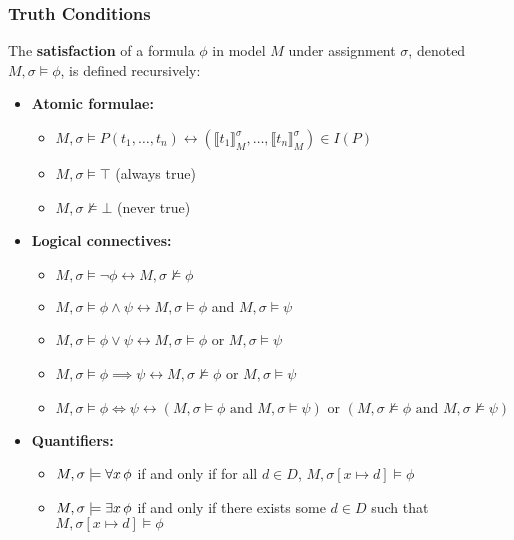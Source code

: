 \subsubsection{Truth Conditions}
The \textbf{satisfaction} of a formula \(\phi\) in model \(M\) under assignment \(\sigma\), denoted \(M, \sigma \models \phi\), is defined recursively:

\begin{itemize}
  \item \textbf{Atomic formulae:}
  \begin{itemize}
    \item \(M, \sigma \models P(t_1, \ldots, t_n) \leftrightarrow (\llbracket t_1 \rrbracket_M^\sigma, \ldots, \llbracket t_n \rrbracket_M^\sigma) \in I(P)\)
    \item \(M, \sigma \models \top\) (always true)
    \item \(M, \sigma \not\models \bot\) (never true)
  \end{itemize}
  
  \item \textbf{Logical connectives:}
  \begin{itemize}
    \item \(M, \sigma \models \neg \phi \leftrightarrow M, \sigma \not\models \phi\)
    \item \(M, \sigma \models \phi \land \psi \leftrightarrow M, \sigma \models \phi\) and \(M, \sigma \models \psi\)
    \item \(M, \sigma \models \phi \lor \psi \leftrightarrow M, \sigma \models \phi\) or \(M, \sigma \models \psi\)
    \item \(M, \sigma \models \phi \implies \psi \leftrightarrow M, \sigma \not\models \phi\) or \(M, \sigma \models \psi\)
    \item \(M, \sigma \models \phi \iff \psi \leftrightarrow \left(M, \sigma \models \phi \text{ and } M, \sigma \models \psi\right) \text{ or } \left(M, \sigma \not\models \phi \text{ and } M, \sigma \not\models \psi\right)\)
  \end{itemize}
  
  \item \textbf{Quantifiers:}
  \begin{itemize}
    \item \(M, \sigma \models \forall x \, \phi\) if and only if for all \(d \in D\), \(M, \sigma[x \mapsto d] \models \phi\)
    \item \(M, \sigma \models \exists x \, \phi\) if and only if there exists some \(d \in D\) such that \(M, \sigma[x \mapsto d] \models \phi\)
  \end{itemize}
\end{itemize}

